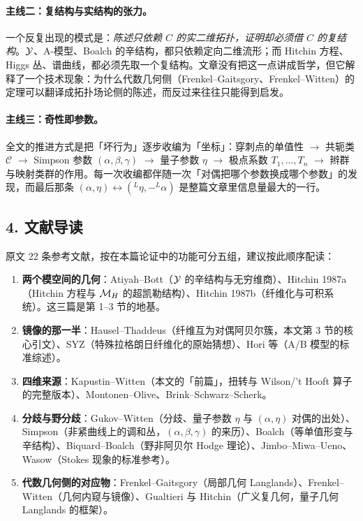 \paragraph{主线二：复结构与实结构的张力。}
一个反复出现的模式是：\emph{陈述只依赖 $C$ 的实二维拓扑，证明却必须借 $C$ 的复结构}。$\mathcal{Y}$、A-模型、Boalch 的辛结构，都只依赖定向二维流形；而 Hitchin 方程、Higgs 丛、谱曲线，都必须先取一个复结构。文章没有把这一点讲成哲学，但它解释了一个技术现象：为什么代数几何侧（Frenkel--Gaitsgory\cite{FrenkelGaitsgory2005}、Frenkel--Witten\cite{FrenkelWitten2007}）的定理可以翻译成拓扑场论侧的陈述，而反过来往往只能得到启发。

\paragraph{主线三：奇性即参数。}
全文的推进方式是把「坏行为」逐步收编为「坐标」：穿刺点的单值性 $\to$ 共轭类 $\mathcal{C}$ $\to$ Simpson 参数 $(\alpha,\beta,\gamma)$ $\to$ 量子参数 $\eta$ $\to$ 极点系数 $T_{1},\dots,T_{n}$ $\to$ 辫群与映射类群的作用。每一次收编都伴随一次「对偶把哪个参数换成哪个参数」的发现，而最后那条 $(\alpha,\eta)\leftrightarrow({}^{L}\eta,-{}^{L}\alpha)$ 是整篇文章里信息量最大的一行。

\subsection*{4. 文献导读}

原文 22 条参考文献，按在本篇论证中的功能可分五组，建议按此顺序配读：

\begin{enumerate}[leftmargin=1.6em,itemsep=2pt]
\item \textbf{两个模空间的几何}：Atiyah--Bott\cite{AtiyahBott1982}（$\mathcal{Y}$ 的辛结构与无穷维商）、Hitchin 1987a\cite{Hitchin1987a}（Hitchin 方程与 $\mathcal{M}_{H}$ 的超凯勒结构）、Hitchin 1987b\cite{Hitchin1987b}（纤维化与可积系统）。这三篇是第 1--3 节的地基。
\item \textbf{镜像的那一半}：Hausel--Thaddeus\cite{HauselThaddeus2002}（纤维互为对偶阿贝尔簇，本文第 3 节的核心引文）、SYZ\cite{Strominger1996}（特殊拉格朗日纤维化的原始猜想）、Hori 等\cite{Hori2003}（A/B 模型的标准综述）。
\item \textbf{四维来源}：Kapustin--Witten\cite{KapustinWitten2007}（本文的「前篇」，扭转与 Wilson/'t Hooft 算子的完整版本）、Montonen--Olive\cite{MontonenOlive1977}、Brink--Schwarz--Scherk\cite{Brink1977}。
\item \textbf{分歧与野分歧}：Gukov--Witten\cite{GukovWitten2006}（分歧、量子参数 $\eta$ 与 $(\alpha,\eta)$ 对偶的出处）、Simpson\cite{Simpson1990}（非紧曲线上的调和丛，$(\alpha,\beta,\gamma)$ 的来历）、Boalch\cite{Boalch2001}（等单值形变与辛结构）、Biquard--Boalch\cite{BiquardBoalch2004}（野非阿贝尔 Hodge 理论）、Jimbo--Miwa--Ueno\cite{Jimbo1981}、Wasow\cite{Wasow1965}（Stokes 现象的标准参考）。
\item \textbf{代数几何侧的对应物}：Frenkel--Gaitsgory\cite{FrenkelGaitsgory2005}（局部几何 Langlands）、Frenkel--Witten\cite{FrenkelWitten2007}（几何内窥与镜像）、Gualtieri\cite{Gualtieri2003} 与 Hitchin\cite{Hitchin2003}（广义复几何，量子几何 Langlands 的框架）。
\end{enumerate}

